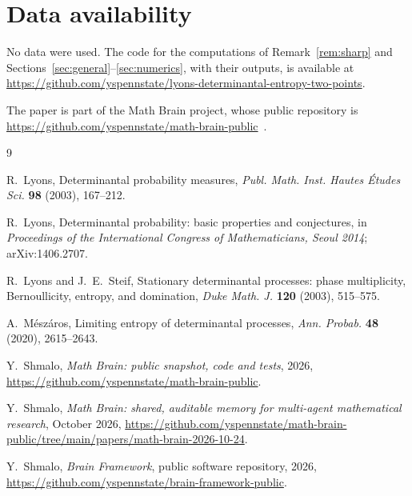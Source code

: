 \documentclass[11pt]{amsart}
\theoremstyle{remark}
\numberwithin{equation}{section}
\begin{document}
\section*{Data availability}
No data were used. The code for the computations of Remark~\ref{rem:sharp} and Sections~\ref{sec:general}--\ref{sec:numerics}, with their outputs, is available at\\ \url{https://github.com/yspennstate/lyons-determinantal-entropy-two-points}.

The paper is part of the Math Brain project, whose public repository is \url{https://github.com/yspennstate/math-brain-public}~\cite{MathBrainRepo}.

\begin{thebibliography}{9}

R.~Lyons, Determinantal probability measures, \emph{Publ. Math. Inst. Hautes \'Etudes Sci.} \textbf{98} (2003), 167--212.

R.~Lyons, Determinantal probability: basic properties and conjectures, in \emph{Proceedings of the International Congress of Mathematicians, Seoul 2014}; arXiv:1406.2707.

R.~Lyons and J.~E.~Steif, Stationary determinantal processes: phase multiplicity, Bernoullicity, entropy, and domination, \emph{Duke Math. J.} \textbf{120} (2003), 515--575.

A.~M\'esz\'aros, Limiting entropy of determinantal processes, \emph{Ann. Probab.} \textbf{48} (2020), 2615--2643.

 Y.~Shmalo, \emph{Math Brain: public snapshot, code and tests}, 2026, \url{https://github.com/yspennstate/math-brain-public}.

 Y.~Shmalo, \emph{Math Brain: shared, auditable memory for multi-agent mathematical research}, October 2026, \url{https://github.com/yspennstate/math-brain-public/tree/main/papers/math-brain-2026-10-24}.

 Y.~Shmalo, \emph{Brain Framework}, public software repository, 2026, \url{https://github.com/yspennstate/brain-framework-public}.

\end{thebibliography}
\end{document}
